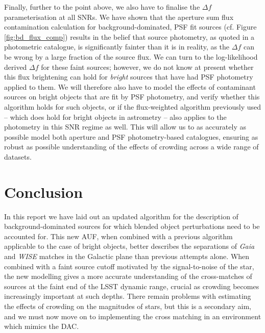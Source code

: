 \documentclass[fleqn,usenatbib]{mnras}
\begin{document}
Finally, further to the point above, we also have to finalise the $\Delta f$ parameterisation at all SNRs. We have shown that the aperture sum flux contamination calculation for background-dominated, PSF fit sources (cf. Figure \ref{fig:bd_flux_comp}) results in the belief that source photometry, as quoted in a photometric catalogue, is significantly fainter than it is in reality, as the $\Delta f$ can be wrong by a large fraction of the source flux. We can turn to the log-likelihood derived $\Delta f$ for these faint sources; however, we do not know at present whether this flux brightening can hold for \textit{bright} sources that have had PSF photometry applied to them. We will therefore also have to model the effects of contaminant sources on bright objects that are fit by PSF photometry, and verify whether this algorithm holds for such objects, or if the flux-weighted algorithm previously used -- which does hold for bright objects in astrometry -- also applies to the photometry in this SNR regime as well. This will allow us to as accurately as possible model both aperture and PSF photometry-based catalogues, ensuring as robust as possible understanding of the effects of crowding across a wide range of datasets.

\section{Conclusion}
In this report we have laid out an updated algorithm for the description of background-dominated sources for which blended object perturbations need to be accounted for. This new AUF, when combined with a previous algorithm applicable to the case of bright objects, better describes the separations of \textit{Gaia} and \textit{WISE} matches in the Galactic plane than previous attempts alone. 
When combined with a faint source cutoff motivated by the signal-to-noise of the star, the new modelling gives a more accurate understanding of the cross-matches of sources at the faint end of the LSST dynamic range, crucial as crowding becomes increasingly important at such depths.
There remain problems with estimating the effects of crowding on the magnitudes of stars, but this is a secondary aim, and we must now move on to implementing the cross matching in an environment which mimics the DAC. 







\bsp	%
\label{lastpage}
\end{document}
